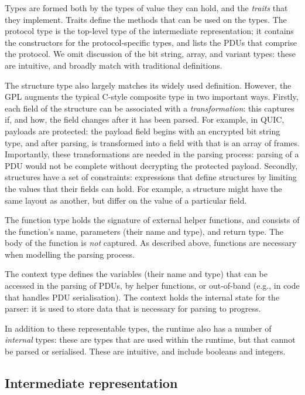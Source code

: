 \documentclass[10pt,sigconf]{acmart}
\begin{document}
Types are formed both by the types of value they can hold, and the \emph{traits} that they
implement. Traits define the methods that can be used on the types. The protocol type is
the top-level type of the intermediate representation; it contains the constructors for
the protocol-specific types, and lists the PDUs that comprise the protocol. We omit
discussion of the bit string, array, and variant types: these are intuitive, and broadly
match with traditional definitions.

The structure type also largely matches its widely used definition. However, the GPL
augments the typical C-style composite type in two important ways. Firstly, each field of
the structure can be associated with a \emph{transformation}: this captures if, and how,
the field changes after it has been parsed. For example, in QUIC, payloads are protected:
the payload field begins with an encrypted bit string type, and after parsing, is
transformed into a field with that is an array of frames. Importantly, these
transformations are needed in the parsing process: parsing of a PDU would not be complete
without decrypting the protected payload. Secondly, structures have a set of constraints:
expressions that define structures by limiting the values that their fields can hold. For
example, a structure might have the same layout as another, but differ on the value of a
particular field.

The function type holds the signature of external helper functions, and consists of the
function's name, parameters (their name and type), and return type. The body of the
function is \emph{not} captured. As described above, functions are necessary when
modelling the parsing process.

The context type defines the variables (their name and type) that can be accessed in the
parsing of PDUs, by helper functions, or out-of-band (e.g., in code that handles PDU
serialisation). The context holds the internal state for the parser: it is used to store
data that is necessary for parsing to progress.

In addition to these representable types, the runtime also has a number of \emph{internal}
types: these are types that are used within the runtime, but that cannot be parsed or
serialised. These are intuitive, and include booleans and integers.

\subsection{Intermediate representation}
\label{sec:gpl-ir}
\end{document}
